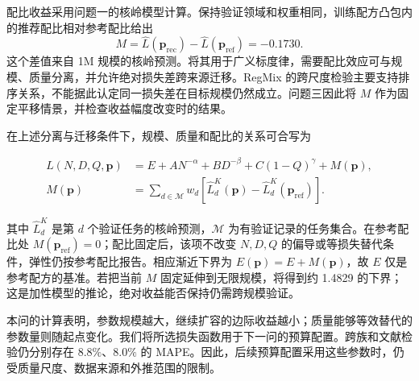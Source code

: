 配比收益采用问题一的核岭模型计算。保持验证领域和权重相同，训练配方凸包内的推荐配比相对参考配比给出
\[
  M=\hat L(\bm p_{\mathrm{rec}})-\hat L(\bm p_{\mathrm{ref}})=-0.1730.
\]
这个差值来自 1M 规模的核岭预测。将其用于广义标度律，需要配比效应可与规模、质量分离，并允许绝对损失差跨来源迁移。RegMix 的跨尺度检验主要支持排序关系\cite{liu2024regmix}，不能据此认定同一损失差在目标规模仍然成立。问题三因此将 $M$ 作为固定平移情景，并检查收益幅度改变时的结果。
\par

\begin{samepage}
在上述分离与迁移条件下，规模、质量和配比的关系可合写为
\par\nopagebreak[4]
\begin{equation}
  \begin{aligned}
    L(N,D,Q,\bm p)&=E+AN^{-\alpha}+BD^{-\beta}+C(1-Q)^\gamma+M(\bm p),\\
    M(\bm p)&=\sum_{d\in\mathcal M}w_d\left[\hat L_d^K(\bm p)-\hat L_d^K(\bm p_{\mathrm{ref}})\right].
  \end{aligned}
\end{equation}
\end{samepage}
其中 $\hat L_d^K$ 是第 $d$ 个验证任务的核岭预测，$\mathcal M$ 为有验证记录的任务集合。在参考配比处 $M(\bm p_{\mathrm{ref}})=0$；配比固定后，该项不改变 $N,D,Q$ 的偏导或等损失替代条件，弹性仍按参考配比报告。相应渐近下界为 $E(\bm p)=E+M(\bm p)$，故 $E$ 仅是参考配方的基准。若把当前 $M$ 固定延伸到无限规模，将得到约 1.4829 的下界；这是加性模型的推论，绝对收益能否保持仍需跨规模验证。

本问的计算表明，参数规模越大，继续扩容的边际收益越小；质量能够等效替代的参数量则随起点变化。我们将所选损失函数用于下一问的预算配置。跨族和文献检验仍分别存在 $8.8\%$、$8.0\%$ 的 MAPE。因此，后续预算配置采用这些参数时，仍受质量尺度、数据来源和外推范围的限制。
\endgroup
